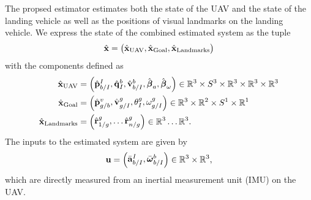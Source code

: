 
The propsed estimator estimates both the state of
the UAV and the state of the landing vehicle as well as the positions of visual
landmarks on the landing vehicle.
We express the state of the combined estimated system as the tuple
\begin{equation*}
  \hat{\boldsymbol{\mathrm{x}}} =
  \begin{pmatrix}
    \hat{\boldsymbol{\mathrm{x}}}_{\text{UAV}}, \hat{\boldsymbol{\mathrm{x}}}_{\text{Goal}}, \hat{\boldsymbol{\mathrm{x}}}_{\text{Landmarks}}
  \end{pmatrix}
\end{equation*}
with the components defined as
\begin{align*}
  \hat{\boldsymbol{\mathrm{x}}}_{\text{UAV}} &=
  \begin{pmatrix}
    \hat{\boldsymbol{\mathrm{p}}}_{b/I}^{I}, \hat{\boldsymbol{\mathrm{q}}}_I^{b}, \hat{\boldsymbol{\mathrm{v}}}_{b/I}^b,
    \hat{\boldsymbol{\mathrm{\beta}}}_a,
    \hat{\boldsymbol{\mathrm{\beta}}}_{\omega}
  \end{pmatrix}
  \in \mathbb{R}^3 \times S^3 \times \mathbb{R}^3 \times \mathbb{R}^3 \times
    \mathbb{R}^3  \\
    \hat{\boldsymbol{\mathrm{x}}}_{\text{Goal}} & =
    \begin{pmatrix}
      \hat{\boldsymbol{\mathrm{p}}}_{g/b}^{v}, \hat{\boldsymbol{\mathrm{v}}}_{g/I}^{g}, \theta_{I}^{g},
      \omega_{g/I}^{g}
    \end{pmatrix}
    \in \mathbb{R}^3 \times \mathbb{R}^2 \times S^1 \times \mathbb{R}^1
    \\
    \hat{\boldsymbol{\mathrm{x}}}_{\text{Landmarks}} & =
    \begin{pmatrix}
      \hat{\boldsymbol{\mathrm{r}}}_{1/g}^{g}, \dots \hat{\boldsymbol{\mathrm{r}}}_{n/g}^{g}
    \end{pmatrix}
    \in \mathbb{R}^3 \dots \mathbb{R}^3.
\end{align*}
The inputs to the estimated system are given by
\begin{equation*}
  \boldsymbol{\mathrm{u}} = \begin{pmatrix} \bar{\boldsymbol{\mathrm{a}}}_{b/I}^I, \bar{\boldsymbol{\mathrm{\omega}}}_{b/I}^b \end{pmatrix} \in
        \mathbb{R}^3 \times \mathbb{R}^3,
\end{equation*}
which are directly measured from an inertial measurement unit (IMU) on the UAV.

